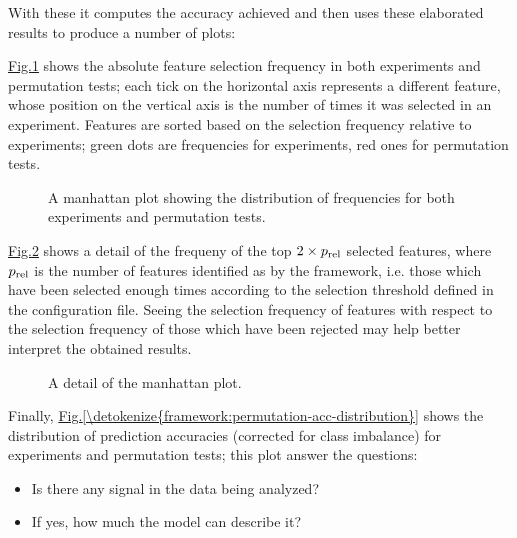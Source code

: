 \documentclass[letterpaper,10pt,english]{sphinxmanual}
\begin{document}
With these it computes the accuracy achieved and then uses these elaborated results to produce a number of plots:

\hyperref[\detokenize{framework:manhattan-plot}]{Fig.\@ \ref{\detokenize{framework:manhattan-plot}}} shows the absolute feature selection frequency in both  experiments and permutation tests; each tick on the horizontal axis represents a different feature, whose position on the vertical axis is the number of times it was selected in an experiment. Features are sorted based on the selection frequency relative to  experiments; green dots are frequencies for  experiments, red ones for permutation tests.
\begin{figure}[htbp]
\centering
\capstart

\noindent{}
\caption{A manhattan plot showing the distribution of frequencies for both  experiments and permutation tests.}\label{\detokenize{framework:manhattan-plot}}\end{figure}

\hyperref[\detokenize{framework:signature-frequencies}]{Fig.\@ \ref{\detokenize{framework:signature-frequencies}}} shows a detail of the frequeny of the top \(2 \times p_{\rm rel}\) selected features, where \(p_{\rm rel}\) is the number of features identified as  by the framework, i.e. those which have been selected enough times according to the selection threshold defined in the configuration file. Seeing the selection frequency of  features with respect to the selection frequency of those which have been rejected may help better interpret the obtained results.
\begin{figure}[htbp]
\centering
\capstart

\noindent{}
\caption{A detail of the manhattan plot.}\label{\detokenize{framework:signature-frequencies}}\end{figure}

Finally, \hyperref[\detokenize{framework:permutation-acc-distribution}]{Fig.\@ \ref{\detokenize{framework:permutation-acc-distribution}}} shows the distribution of prediction accuracies (corrected for class imbalance) for  experiments and permutation tests; this plot answer the questions:
\begin{itemize}
\item {} 
Is there any signal in the data being analyzed?

\item {} 
If yes, how much the model can describe it?

\end{itemize}
\end{document}

